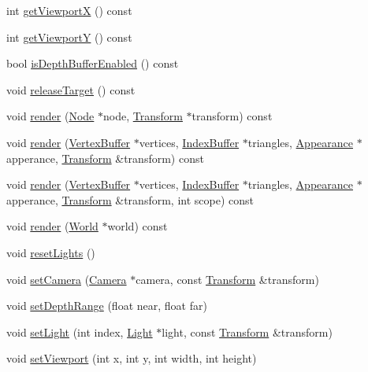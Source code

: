 \begin{CompactItemize}
int \hyperlink{classm3g_1_1Graphics3D_af58b44cc6219f86c40dadb8a9377856}{getViewportX} () const 
\item 
int \hyperlink{classm3g_1_1Graphics3D_c21665afbf94a8f0153e099833c2b61a}{getViewportY} () const 
\item 
bool \hyperlink{classm3g_1_1Graphics3D_7f17c6781152840d42e756c27b0fb8c8}{isDepthBufferEnabled} () const 
\item 
void \hyperlink{classm3g_1_1Graphics3D_3ffaaf0d0f1e97a07c7f30c9b5a5dd32}{releaseTarget} () const 
\item 
void \hyperlink{classm3g_1_1Graphics3D_9c9ca78b3ce4cc358783a1a2701b9d85}{render} (\hyperlink{classm3g_1_1Node}{Node} $\ast$node, \hyperlink{classm3g_1_1Transform}{Transform} $\ast$transform) const 
\item 
void \hyperlink{classm3g_1_1Graphics3D_dc32291b31d6d3a32037eb9f727f73c0}{render} (\hyperlink{classm3g_1_1VertexBuffer}{VertexBuffer} $\ast$vertices, \hyperlink{classm3g_1_1IndexBuffer}{IndexBuffer} $\ast$triangles, \hyperlink{classm3g_1_1Appearance}{Appearance} $\ast$apperance, \hyperlink{classm3g_1_1Transform}{Transform} \&transform) const 
\item 
void \hyperlink{classm3g_1_1Graphics3D_9179d0d886a57cd3234b34f1b59dfc3c}{render} (\hyperlink{classm3g_1_1VertexBuffer}{VertexBuffer} $\ast$vertices, \hyperlink{classm3g_1_1IndexBuffer}{IndexBuffer} $\ast$triangles, \hyperlink{classm3g_1_1Appearance}{Appearance} $\ast$apperance, \hyperlink{classm3g_1_1Transform}{Transform} \&transform, int scope) const 
\item 
void \hyperlink{classm3g_1_1Graphics3D_8ef004c92d601203b8c697d441e7713f}{render} (\hyperlink{classm3g_1_1World}{World} $\ast$world) const 
\item 
void \hyperlink{classm3g_1_1Graphics3D_b8821ec231e8ebd939ae0feaaf138542}{resetLights} ()
\item 
void \hyperlink{classm3g_1_1Graphics3D_0df7bb61cfeba6626e20fd07ddd1c460}{setCamera} (\hyperlink{classm3g_1_1Camera}{Camera} $\ast$camera, const \hyperlink{classm3g_1_1Transform}{Transform} \&transform)
\item 
void \hyperlink{classm3g_1_1Graphics3D_6fc3837286f3516aa3320aeec9729495}{setDepthRange} (float near, float far)
\item 
void \hyperlink{classm3g_1_1Graphics3D_2bf83cb69f50117dd9d5548fe96d0ab0}{setLight} (int index, \hyperlink{classm3g_1_1Light}{Light} $\ast$light, const \hyperlink{classm3g_1_1Transform}{Transform} \&transform)
\item 
void \hyperlink{classm3g_1_1Graphics3D_0b4ec48e9c19060e9be5648c118c23b1}{setViewport} (int x, int y, int width, int height)
\end{CompactItemize}
